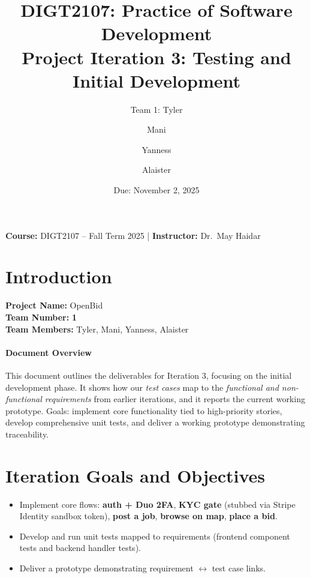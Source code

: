 \documentclass[11pt]{article}
\title{DIGT2107: Practice of Software Development\\
\Large Project Iteration 3: Testing and Initial Development\\[4pt]
\large \product}
\author{Team 1: Tyler \and Mani \and Yanness \and Alaister}
\date{Due: November 2, 2025}
\newcommand{\product}{OpenBid}
\begin{document}
\maketitle

\begin{center}
\textbf{Course:} DIGT2107 -- Fall Term 2025 \quad|\quad
\textbf{Instructor:} Dr.\ May Haidar
\end{center}

\tableofcontents
\newpage

\section{Introduction}
\textbf{Project Name:} \product \\
\textbf{Team Number:} \textbf{1} \\
\textbf{Team Members:} Tyler, Mani, Yanness, Alaister

\paragraph{Document Overview}
This document outlines the deliverables for Iteration 3, focusing on the initial development phase. It shows how our \textit{test cases} map to the \textit{functional and non-functional requirements} from earlier iterations, and it reports the current working prototype. Goals: implement core functionality tied to high-priority stories, develop comprehensive unit tests, and deliver a working prototype demonstrating traceability.

\section{Iteration Goals and Objectives}
\begin{itemize}[leftmargin=1.4em]
  \item Implement core flows: \textbf{auth + Duo 2FA}, \textbf{KYC gate} (stubbed via Stripe Identity sandbox token), \textbf{post a job}, \textbf{browse on map}, \textbf{place a bid}.
  \item Develop and run unit tests mapped to requirements (frontend component tests and backend handler tests).
  \item Deliver a prototype demonstrating requirement \(\leftrightarrow\) test case links.
\end{itemize}
\end{document}
